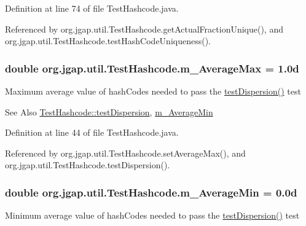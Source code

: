 Definition at line 74 of file Test\-Hashcode.\-java.



Referenced by org.\-jgap.\-util.\-Test\-Hashcode.\-get\-Actual\-Fraction\-Unique(), and org.\-jgap.\-util.\-Test\-Hashcode.\-test\-Hash\-Code\-Uniqueness().

\hypertarget{classorg_1_1jgap_1_1util_1_1_test_hashcode_a0d91cff36298abbb9761e0a864b79df9}{
\subsubsection[{m\-\_\-\-Average\-Max}]{\setlength{\rightskip}{0pt plus 5cm}double org.\-jgap.\-util.\-Test\-Hashcode.\-m\-\_\-\-Average\-Max = 1.\-0d\hspace{0.3cm}{\ttfamily [private]}}}\label{classorg_1_1jgap_1_1util_1_1_test_hashcode_a0d91cff36298abbb9761e0a864b79df9}
Maximum average value of hash\-Codes needed to pass the \hyperlink{classorg_1_1jgap_1_1util_1_1_test_hashcode_a08e541143a78fdf8902cedac17e1f65d}{test\-Dispersion()} test

\begin{DoxySeeAlso}{See Also}
\hyperlink{classorg_1_1jgap_1_1util_1_1_test_hashcode_a08e541143a78fdf8902cedac17e1f65d}{Test\-Hashcode\-::test\-Dispersion}, \hyperlink{classorg_1_1jgap_1_1util_1_1_test_hashcode_abfb003e9bfca7edd80c68823024178d5}{m\-\_\-\-Average\-Min} 
\end{DoxySeeAlso}


Definition at line 44 of file Test\-Hashcode.\-java.



Referenced by org.\-jgap.\-util.\-Test\-Hashcode.\-set\-Average\-Max(), and org.\-jgap.\-util.\-Test\-Hashcode.\-test\-Dispersion().

\hypertarget{classorg_1_1jgap_1_1util_1_1_test_hashcode_abfb003e9bfca7edd80c68823024178d5}{
\subsubsection[{m\-\_\-\-Average\-Min}]{\setlength{\rightskip}{0pt plus 5cm}double org.\-jgap.\-util.\-Test\-Hashcode.\-m\-\_\-\-Average\-Min = 0.\-0d\hspace{0.3cm}{\ttfamily [private]}}}\label{classorg_1_1jgap_1_1util_1_1_test_hashcode_abfb003e9bfca7edd80c68823024178d5}
Minimum average value of hash\-Codes needed to pass the \hyperlink{classorg_1_1jgap_1_1util_1_1_test_hashcode_a08e541143a78fdf8902cedac17e1f65d}{test\-Dispersion()} test

